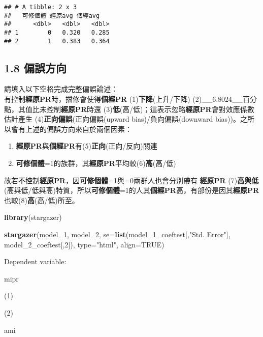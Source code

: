 \documentclass[]{article}
\newenvironment{Shaded}{\begin{snugshade}}{\end{snugshade}}
\newcommand{\KeywordTok}[1]{\textcolor[rgb]{0.13,0.29,0.53}{\textbf{#1}}}
\newcommand{\DataTypeTok}[1]{\textcolor[rgb]{0.13,0.29,0.53}{#1}}
\newcommand{\DecValTok}[1]{\textcolor[rgb]{0.00,0.00,0.81}{#1}}
\newcommand{\StringTok}[1]{\textcolor[rgb]{0.31,0.60,0.02}{#1}}
\newcommand{\OtherTok}[1]{\textcolor[rgb]{0.56,0.35,0.01}{#1}}
\newcommand{\NormalTok}[1]{#1}
\providecommand{\tightlist}{%
  \setlength{\itemsep}{0pt}\setlength{\parskip}{0pt}}
\begin{document}
\begin{verbatim}
## # A tibble: 2 x 3
##   可修個體 經原avg 個經avg
##      <dbl>   <dbl>   <dbl>
## 1        0   0.320   0.285
## 2        1   0.383   0.364
\end{verbatim}

\subsection{1.8 偏誤方向}

請填入以下空格完成完整偏誤論述：\\
有控制\textbf{經原PR}時，擋修會使得\textbf{個經PR}
(1)\textbf{下降}(上升/下降)
(2)\_\_6.8024\_\_百分點，其值比未控制\textbf{經原PR}時還
(3)\textbf{低}(高/低)；這表示忽略\textbf{經原PR}會對效應係數估計產生
(4)\textbf{正向偏誤}(正向偏誤(upward bias)/負向偏誤(downward
bias))。之所以會有上述的偏誤方向來自於兩個因素：

\begin{enumerate}
\def\labelenumi{\arabic{enumi}.}
\tightlist
\item
  \textbf{經原PR}與\textbf{個經PR}有(5)\textbf{正向}(正向/反向)關連
\item
  \textbf{可修個體}=1的族群，其\textbf{經原PR}平均較(6)\textbf{高}(高/低)
\end{enumerate}

故若不控制\textbf{經原PR}，因\textbf{可修個體}=1與=0兩群人也會分別帶有
\textbf{經原PR}
(7)\textbf{高與低}(高與低/低與高)特質，所以\textbf{可修個體}=1的人其\textbf{個經PR}高，有部份是因其\textbf{經原PR}也較(8)\textbf{高}(高/低)所至。

\begin{Shaded}
\begin{Highlighting}[]
\KeywordTok{library}\NormalTok{(stargazer)}

\KeywordTok{stargazer}\NormalTok{(model_}\DecValTok{1}\NormalTok{, model_}\DecValTok{2}\NormalTok{, }
          \DataTypeTok{se=}\KeywordTok{list}\NormalTok{(model_1_coeftest[,}\StringTok{"Std. Error"}\NormalTok{], model_2_coeftest[,}\DecValTok{2}\NormalTok{]),}
          \DataTypeTok{type=}\StringTok{"html"}\NormalTok{,}
          \DataTypeTok{align=}\OtherTok{TRUE}\NormalTok{)}
\end{Highlighting}
\end{Shaded}

Dependent variable:

mipr

(1)

(2)

ami
\end{document}
